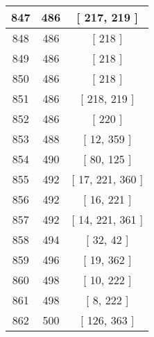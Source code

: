 \begin{center}
\begin{longtable}[H]{|| c c c ||}
847 & 486 & [ 217, 219 ] \\ 
\hline
848 & 486 & [ 218 ] \\ 
\hline
849 & 486 & [ 218 ] \\ 
\hline
850 & 486 & [ 218 ] \\ 
\hline
851 & 486 & [ 218, 219 ] \\ 
\hline
852 & 486 & [ 220 ] \\ 
\hline
853 & 488 & [ 12, 359 ] \\ 
\hline
854 & 490 & [ 80, 125 ] \\ 
\hline
855 & 492 & [ 17, 221, 360 ] \\ 
\hline
856 & 492 & [ 16, 221 ] \\ 
\hline
857 & 492 & [ 14, 221, 361 ] \\ 
\hline
858 & 494 & [ 32, 42 ] \\ 
\hline
859 & 496 & [ 19, 362 ] \\ 
\hline
860 & 498 & [ 10, 222 ] \\ 
\hline
861 & 498 & [ 8, 222 ] \\ 
\hline
862 & 500 & [ 126, 363 ] \\ 
\hline
\end{longtable}
\end{center}
